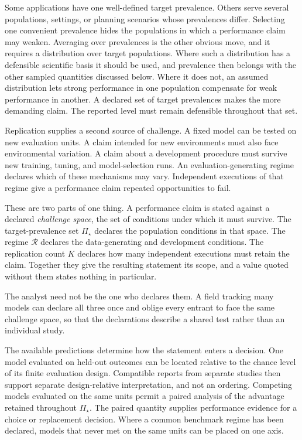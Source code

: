 \documentclass[11pt]{article}
\newcommand{\Regime}{\mathcal{R}}
\newcommand{\PSet}{\Pi_\star}
\theoremstyle{remark}
\begin{document}
Some applications have one well-defined target prevalence. Others serve several populations, settings, or planning scenarios whose prevalences differ. Selecting one convenient prevalence hides the populations in which a performance claim may weaken. Averaging over prevalences is the other obvious move, and it requires a distribution over target populations. Where such a distribution has a defensible scientific basis it should be used, and prevalence then belongs with the other sampled quantities discussed below. Where it does not, an assumed distribution lets strong performance in one population compensate for weak performance in another. A declared set of target prevalences makes the more demanding claim. The reported level must remain defensible throughout that set.

Replication supplies a second source of challenge. A fixed model can be tested on new evaluation units. A claim intended for new environments must also face environmental variation. A claim about a development procedure must survive new training, tuning, and model-selection runs. An evaluation-generating regime declares which of these mechanisms may vary. Independent executions of that regime give a performance claim repeated opportunities to fail.

These are two parts of one thing. A performance claim is stated against a declared \emph{challenge space}, the set of conditions under which it must survive. The target-prevalence set $\PSet$ declares the population conditions in that space. The regime $\Regime$ declares the data-generating and development conditions. The replication count $K$ declares how many independent executions must retain the claim. Together they give the resulting statement its scope, and a value quoted without them states nothing in particular.

The analyst need not be the one who declares them. A field tracking many models can declare all three once and oblige every entrant to face the same challenge space, so that the declarations describe a shared test rather than an individual study.

The available predictions determine how the statement enters a decision. One model evaluated on held-out outcomes can be located relative to the chance level of its finite evaluation design. Compatible reports from separate studies then support separate design-relative interpretation, and not an ordering. Competing models evaluated on the same units permit a paired analysis of the advantage retained throughout $\PSet$. The paired quantity supplies performance evidence for a choice or replacement decision. Where a common benchmark regime has been declared, models that never met on the same units can be placed on one axis.
\end{document}
